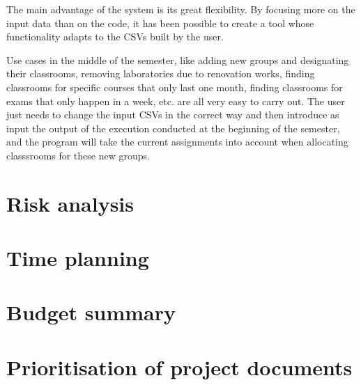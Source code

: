 The main advantage of the system is its great flexibility. By focusing more on the input data than on the code, it has been possible to create a tool whose functionality adapts to the CSVs built by the user.

Use cases in the middle of the semester, like adding new groups and designating their classrooms, removing laboratories due to renovation works, finding classrooms for specific courses that only last one month, finding classrooms for exams that only happen in a week, etc. are all very easy to carry out. The user just needs to change the input CSVs in the correct way and then introduce as input the output of the execution conducted at the beginning of the semester, and the program will take the current assignments into account when allocating classsrooms for these new groups.


\section{Risk analysis}
\section{Time planning}
\section{Budget summary}
\section{Prioritisation of project documents}

